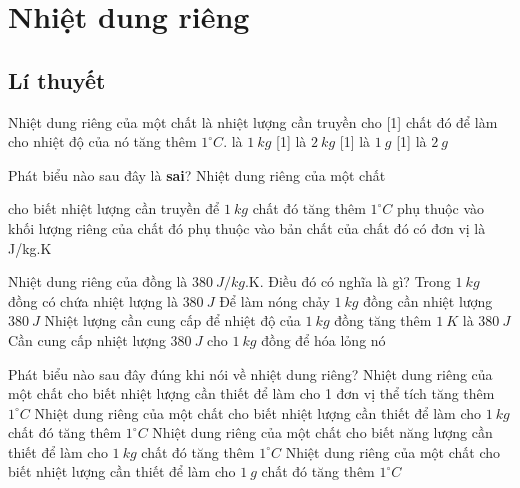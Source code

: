 \section{Nhiệt dung riêng}
\subsection{Lí thuyết}

\begin{ex} 
	Nhiệt dung riêng của một chất là nhiệt lượng cần truyền cho [1] chất đó để làm cho nhiệt độ của nó tăng thêm $1^\circ C$.
	\choice
	{\True [1] là $1 \ kg$}
	{[1] là $2 \ kg$}
	{[1] là $1 \ g$}
	{[1] là $2 \ g$}
\end{ex}
\begin{ex}
	Phát biểu nào sau đây là \textbf{sai}? Nhiệt dung riêng của một chất
	
	\choice
	{cho biết nhiệt lượng cần truyền để $1 \ kg$ chất đó tăng thêm $1^\circ C$}
	{\True phụ thuộc vào khối lượng riêng của chất đó}
	{phụ thuộc vào bản chất của chất đó}
	{có đơn vị là J/kg.K}
	\end{ex}


\begin{ex} 
	Nhiệt dung riêng của đồng là $380 \ J/kg$.K. Điều đó có nghĩa là gì?
	\choice
	{Trong $1 \ kg$ đồng có chứa nhiệt lượng là $380 \ J$}
	{Để làm nóng chảy $1 \ kg$ đồng cần nhiệt lượng $380 \ J$}
	{\True Nhiệt lượng cần cung cấp để nhiệt độ của $1 \ kg$ đồng tăng thêm $1 \ K$ là $380 \ J$}
	{Cần cung cấp nhiệt lượng $380 \ J$ cho $1 \ kg$ đồng để hóa lỏng nó}
	
\end{ex}
\begin{ex} 
	Phát biểu nào sau đây đúng khi nói về nhiệt dung riêng?
	\choice
	{Nhiệt dung riêng của một chất cho biết nhiệt lượng cần thiết để làm cho 1 đơn vị thể tích tăng thêm $1^\circ C$}
	{\True Nhiệt dung riêng của một chất cho biết nhiệt lượng cần thiết để làm cho $1 ~kg$ chất đó tăng thêm $1^\circ C$}
	{Nhiệt dung riêng của một chất cho biết năng lượng cần thiết để làm cho $1 ~kg$ chất đó tăng thêm $1^\circ C$}
	{Nhiệt dung riêng của một chất cho biết nhiệt lượng cần thiết để làm cho $1 ~g$ chất đó tăng thêm $1^\circ C$}
	\loigiai{
	}
\end{ex}

